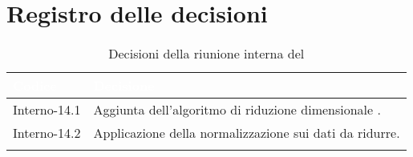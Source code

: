 \section{Registro delle decisioni}
{
\renewcommand{\arraystretch}{1.5}
\centering
\begin{longtable}{C{3cm} C{9cm}}
\textcolor{white}{\textbf{Codice}}&
\textcolor{white}{\textbf{Decisione}}\\	

\endhead
		
Interno-14.1 & Aggiunta dell'algoritmo di riduzione dimensionale . \\
Interno-14.2 & Applicazione della normalizzazione sui dati da ridurre. \\

\caption{Decisioni della riunione interna del \Data{}}
\end{longtable}
}

